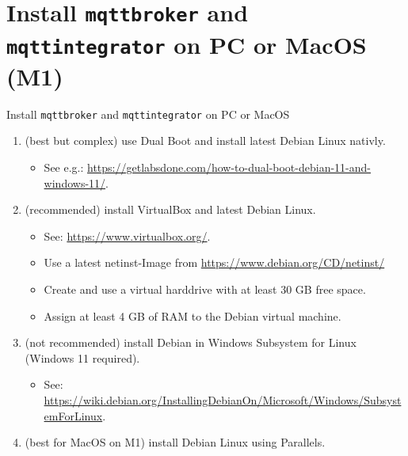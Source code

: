 \withsectionpage
\section{Install \texttt{mqttbroker} and \texttt{mqttintegrator} on PC or MacOS (M1)}

\begin{frame}{Install \texttt{mqttbroker} and \texttt{mqttintegrator} on PC or MacOS}
  \begin{enumerate}
    \item[Either] (best but complex) use \textcolor{fh-ooe-red}{Dual Boot} and install \textcolor{fh-ooe-red}{latest Debian} Linux \textcolor{fh-ooe-red}{nativly}.
    \begin{itemize}
      \item See e.g.: \textcolor{fh-ooe-red}{\href{https://getlabsdone.com/how-to-dual-boot-debian-11-and-windows-11/}{https://getlabsdone.com/how-to-dual-boot-debian-11-and-windows-11/}}.
    \end{itemize}
    \item[Or] (recommended) install \textcolor{fh-ooe-red}{VirtualBox} and \textcolor{fh-ooe-red}{latest Debian} Linux.
    \begin{itemize}
      \item See: \textcolor{fh-ooe-red}{\href{https://www.virtualbox.org/}{https://www.virtualbox.org/}}.
      \item Use a latest \textcolor{fh-ooe-red}{netinst-Image} from \textcolor{fh-ooe-red}{\href{https://www.debian.org/CD/netinst/}{https://www.debian.org/CD/netinst/}}
      \item Create and use a virtual harddrive with at least \textcolor{fh-ooe-red}{30 GB} free space.
      \item Assign at least \textcolor{fh-ooe-red}{4 GB} of \textcolor{fh-ooe-red}{RAM} to the \textcolor{fh-ooe-red}{Debian virtual machine}.
    \end{itemize}
    \item[Or] (not recommended) install Debian in Windows Subsystem for Linux (Windows 11 required).
    \begin{itemize}
      \item See: \textcolor{fh-ooe-red}{\href{https://wiki.debian.org/InstallingDebianOn/Microsoft/Windows/SubsystemForLinux}{https://wiki.debian.org/InstallingDebianOn/Microsoft/Windows/SubsystemForLinux}}.
    \end{itemize}
    \item[Or] (best for \textcolor{fh-ooe-red}{MacOS} on M1) install Debian Linux using \textcolor{fh-ooe-red}{Parallels}.

\end{enumerate}
\end{frame}
